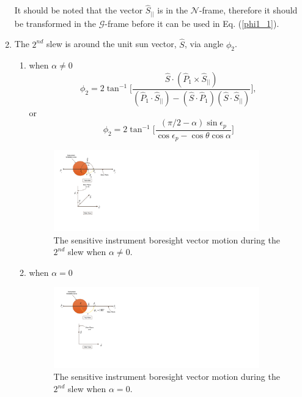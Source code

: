 \documentclass[letterpaper, paper,12pt]{AAS}		%
\begin{document}
\begin{enumerate}
		It should be noted that the vector $\hat{S}_{||}$ is in the $\mathcal{N}$-frame, therefore it should be transformed in the $\mathcal{G}$-frame before it can be used in Eq. (\ref{phi1_1}).
		\item The $2^{nd}$ slew is around the unit sun vector, $\hat{S}$, via angle $\phi_2$.
		\begin{enumerate}
			\item when $\alpha\neq0$
\begin{equation}
\phi_2=2\tan^{-1}\Big[ \frac{\hat{S}\cdot (\hat{P}_1\times\hat{S}_{||})}{(\hat{P}_1\cdot\hat{S}_{||})-(\hat{S}\cdot\hat{P}_1)(\hat{S}\cdot\hat{S}_{||})}\Big], 
\end{equation}
or
\begin{equation} 
\phi_2=2\tan^{-1}\Big[ \frac{(\pi/2-\alpha)\sin\epsilon_p}{\cos\epsilon_p-\cos\theta\cos\alpha}\Big]
\end{equation}
			\begin{figure}[H]
				\begin{center}
					\includegraphics[width=3.5in]{./Figures/SVAS_2r_modified}
					\caption{The sensitive instrument boresight vector motion during the $2^{nd}$ slew when $\alpha\neq 0$.}
				\end{center}
			\end{figure}
			
			\item when $\alpha=0$
			\begin{figure}[H]
				\begin{center}
					\includegraphics[width=3.5in]{./Figures/SVAS_3r_modified}
						\caption{The sensitive instrument boresight vector motion during the $2^{nd}$ slew when $\alpha= 0$.}
				\end{center}
			\end{figure}
		\end{enumerate}
		

\end{enumerate}
\end{document}
